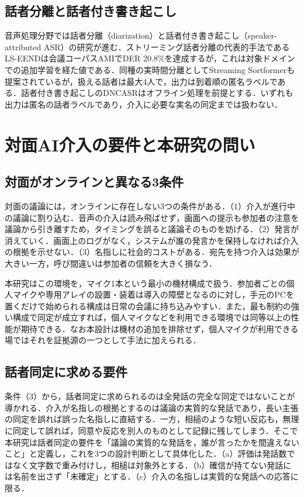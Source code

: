 \documentclass[a4paper]{ltjsarticle}
\begin{document}
\subsection{話者分離と話者付き書き起こし}
音声処理分野では話者分離（diarization）と話者付き書き起こし（speaker-attributed ASR）の研究が進む．ストリーミング話者分離の代表的手法であるLS-EEND\cite{liang}は会議コーパスAMIでDER 20.8\%を達成するが，これは対象ドメインでの追加学習を経た値である．同種の実時間分離としてStreaming Sortformer\cite{medennikov}も提案されているが，扱える話者は最大4人で，出力は到着順の匿名ラベルである．話者付き書き起こしのDNCASR\cite{zheng}はオフライン処理を前提とする．いずれも出力は匿名の話者ラベルであり，介入に必要な実名の同定までは扱わない．

\section{対面AI介入の要件と本研究の問い}
\subsection{対面がオンラインと異なる3条件}
対面の議論には，オンラインに存在しない3つの条件がある．（1）介入が進行中の議論に割り込む．音声の介入は読み飛ばせず，画面への提示も参加者の注意を議論から引き離すため，タイミングを誤ると議論そのものを妨げる．（2）発言が消えていく．画面上のログがなく，システムが誰の発言かを保持しなければ介入の根拠を示せない．（3）名指しに社会的コストがある．宛先を持つ介入は効果が大きい一方，呼び間違いは参加者の信頼を大きく損なう．

本研究はこの環境を，マイク1本という最小の機材構成で扱う．参加者ごとの個人マイクや専用アレイの設置・装着は導入の障壁となるのに対し，手元のPCを置くだけで始められる構成は日常の会議に持ち込みやすい．また，最も制約の強い構成で同定が成立すれば，個人マイクなどを利用できる環境では同等以上の性能が期待できる．なお本設計は機材の追加を排除せず，個人マイクが利用できる場ではそれを証拠源の一つとして手法に加えられる．

\subsection{話者同定に求める要件}
条件（3）から，話者同定に求められるのは全発話の完全な同定ではないことが導かれる．介入が名指しの根拠とするのは議論の実質的な発話であり，長い主張の同定を誤れば誤った名指しに直結する．一方，相槌のような短い反応も，無理に同定して誤れば，同意や反応を別人のものとして記録に残してしまう．そこで本研究は話者同定の要件を「議論の実質的な発話を，誰が言ったかを間違えないこと」と定義し，これを3つの設計判断として具体化した．（a）評価は発話数ではなく文字数で重み付けし，相槌は対象外とする．（b）確信が持てない発話には名前を出さず「未確定」とする．（c）介入の名指しは実質的な発話への応答に限る．
\end{document}
